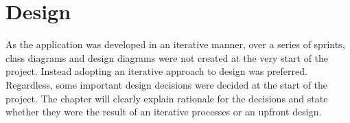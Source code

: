 \chapter{Design}







As the application was developed in an iterative manner, over a series of sprints, class diagrams and design diagrams were not created at the very start of the project. Instead adopting an iterative approach to design was preferred. Regardless, some important design decisions were decided at the start of the project. The chapter will clearly explain rationale for the decisions and state whether they were the result of an iterative processes or an upfront design.


